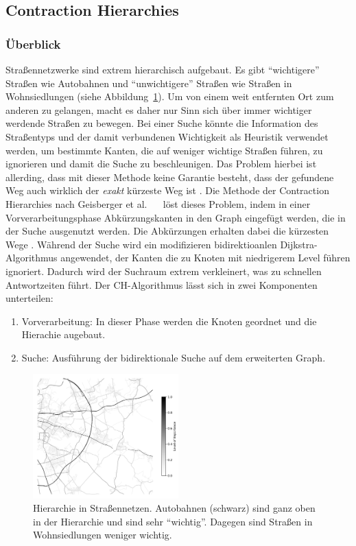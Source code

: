 \subsection{Contraction Hierarchies}
\subsubsection{Überblick}
Straßennetzwerke sind extrem hierarchisch aufgebaut. Es gibt "`wichtigere"' Straßen wie \zB Autobahnen
und "`unwichtigere"' Straßen wie \zB Straßen in Wohnsiedlungen (siehe
Abbildung~\ref{fig:road_hierarchy}). Um von einem weit entfernten Ort zum anderen zu gelangen, macht
es daher nur Sinn sich über immer wichtiger werdende Straßen zu bewegen. Bei einer Suche könnte die
Information des Straßentyps und der damit verbundenen Wichtigkeit als Heuristik verwendet werden, um
bestimmte Kanten, die auf weniger wichtige Straßen führen,  zu ignorieren und damit die Suche zu
beschleunigen. Das Problem hierbei ist allerding, dass mit dieser Methode keine Garantie besteht,
dass der gefundene Weg auch wirklich der \emph{exakt} kürzeste Weg ist . Die Methode der Contraction
Hierarchies nach Geisberger et al.
\cite{geisberger.workshop}~\cite{geisberger.thesis}~\cite{geisberger.exact} löst dieses Problem,
indem in einer Vorverarbeitungsphase Abkürzungskanten in den Graph eingefügt werden, die in der
Suche ausgenutzt werden. Die Abkürzungen erhalten dabei die kürzesten Wege \cite{Bast.20.04.2015}.
Während der Suche wird ein modifizieren bidirektioanlen Dijkstra-Algorithmus angewendet, der Kanten
die zu Knoten mit niedrigerem Level führen ignoriert. Dadurch wird der Suchraum extrem verkleinert,
was zu schnellen Antwortzeiten führt.
Der CH-Algorithmus lässt sich in zwei Komponenten unterteilen:
\begin{enumerate}
    \item Vorverarbeitung: In dieser Phase werden die Knoten geordnet und die Hierachie augebaut.
    \item Suche: Ausführung der bidirektionale Suche auf dem erweiterten Graph.
\end{enumerate}

\begin{figure}[h]
    \centering
    \includegraphics[width=0.5\textwidth]{figures/road_hierarchy.png}
    \caption[Hierarchie in Straßennetzen]{Hierarchie in Straßennetzen. Autobahnen (schwarz) sind ganz oben in der Hierarchie und
        sind sehr "`wichtig"'. Dagegen sind Straßen in Wohnsiedlungen weniger wichtig. \osmcr}
    \label{fig:road_hierarchy}

\end{figure}
